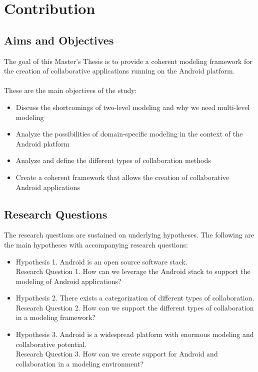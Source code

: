 \section{Contribution}

\subsection{Aims and Objectives}

The goal of this Master's Thesis is to provide a coherent modeling framework for the creation of collaborative applications running on the Android platform. 
\\ \\
These are the main objectives of the study:

\begin{itemize}
\item{Discuss the shortcomings of two-level modeling and why we need multi-level modeling}
\item{Analyze the possibilities of domain-specific modeling in the context of the Android platform}
\item{Analyze and define the different types of collaboration methods}
\item{Create a coherent framework that allows the creation of collaborative Android applications}
\end{itemize}

\subsection{Research Questions}

The research questions are sustained on underlying hypotheses. The following are the main hypotheses with accompanying research questions:

\begin{itemize}
\item{Hypothesis 1. Android is an open source software stack. \\
Research Question 1. How can we leverage the Android stack to support the modeling of Android applications?}
\item{Hypothesis 2. There exists a categorization of different types of collaboration. \\
Research Question 2. How can we support the different types of collaboration in a modeling framework?}
\item{Hypothesis 3. Android is a widespread platform with enormous modeling and collaborative potential. \\
Research Question 3. How can we create support for Android and collaboration in a modeling environment?}
\end{itemize}

